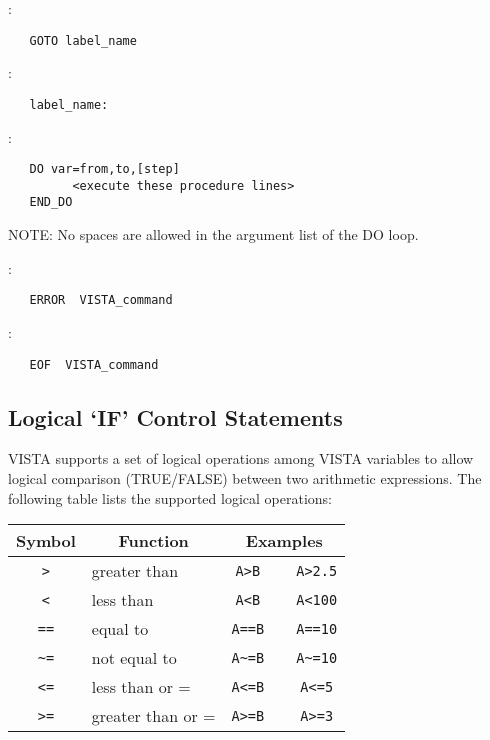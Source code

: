 \noindent {}:
\begin{verbatim}
   GOTO label_name
\end{verbatim}

\noindent {}:
\begin{verbatim}
   label_name:
\end{verbatim}

\noindent {}:
\begin{verbatim}
   DO var=from,to,[step]
         <execute these procedure lines>
   END_DO
\end{verbatim}

\noindent NOTE:  No spaces are allowed in the argument list of the DO loop.

\noindent {}:
\begin{verbatim}
   ERROR  VISTA_command
\end{verbatim}

\noindent {}:
\begin{verbatim}
   EOF  VISTA_command
\end{verbatim}

\subsection{Logical `IF' Control Statements}

VISTA supports a set of logical operations among VISTA variables to allow
logical comparison (TRUE/FALSE) between two arithmetic expressions.  The
following table lists the supported logical operations:

\begin{center}
   \begin{tabular}{|c|l|ccc|} \hline
      Symbol&\multicolumn{1}{|c|}{Function}&
      \multicolumn{3}{c|}{Examples}\\ \hline
      \verb+>+&greater than&\verb+A>B+&&\verb+A>2.5+\\ \hline
      \verb+<+&less than&\verb+A<B+&&\verb+A<100+\\ \hline
      \verb+==+&equal to&\verb+A==B+&&\verb+A==10+\\ \hline
      \verb+~=+&not equal to&\verb+A~=B+&&\verb+A~=10+\\ \hline
      \verb+<=+&less than or =&\verb+A<=B+&&\verb+A<=5+\\ \hline
      \verb+>=+&greater than or =&\verb+A>=B+&&\verb+A>=3+\\ \hline
   \end{tabular}
\end{center}

